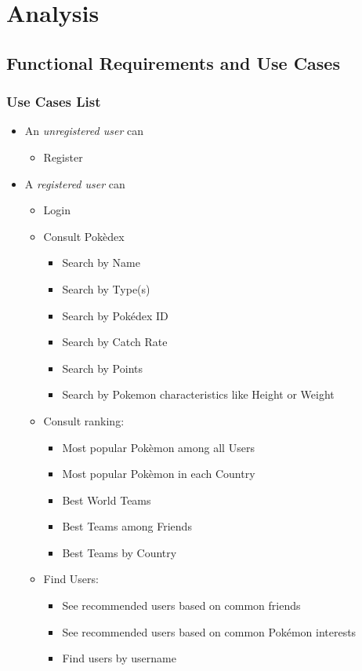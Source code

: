 \section{Analysis}
\subsection{Functional Requirements and Use Cases}
\subsubsection{Use Cases List}
\begin{itemize}
	\item An \textit{unregistered user} can
	\begin{itemize}
		\item Register
	\end{itemize}
	\item A \textit{registered user} can
	\begin{itemize}
		\item Login
		\item Consult Pokèdex
		\begin{itemize}
			\item Search by Name
			\item Search by Type(s)
			\item Search by Pokédex ID
			\item Search by Catch Rate
			\item Search by Points  
			\item Search by Pokemon characteristics like Height or  Weight
		\end{itemize}
		\item Consult ranking:
		\begin{itemize}
			\item Most popular Pokèmon among all Users
			\item Most popular Pokèmon in each Country
			\item Best World Teams
			\item Best Teams among Friends
			\item Best Teams by Country
		\end{itemize}
		\item Find Users:
		\begin{itemize}
			\item See recommended users based on common friends
			\item See recommended users based on common Pokémon interests
			\item Find users by username

\end{itemize}
\end{itemize}
\end{itemize}
